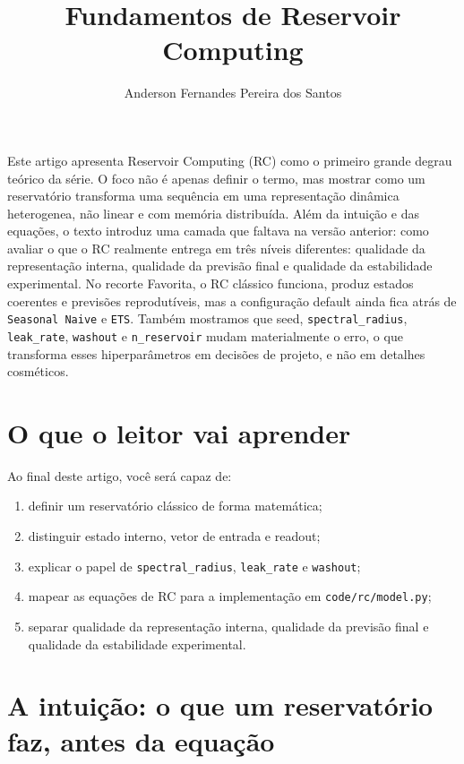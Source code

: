 \documentclass[12pt]{article}
\title{Fundamentos de Reservoir Computing}
\author{Anderson Fernandes Pereira dos Santos}
\providecommand{\tightlist}{%
              \setlength{\itemsep}{0pt}\setlength{\parskip}{0pt}}
\begin{document}
            \maketitle

            \begin{resumo}
            Este artigo apresenta Reservoir Computing (RC) como o primeiro grande degrau teórico da série. O foco não é apenas definir o termo, mas mostrar como um reservatório transforma uma sequência em uma representação dinâmica heterogenea, não linear e com memória distribuída. Além da intuição e das equações, o texto introduz uma camada que faltava na versão anterior: como avaliar o que o RC realmente entrega em três níveis diferentes: qualidade da representação interna, qualidade da previsão final e qualidade da estabilidade experimental. No recorte Favorita, o RC clássico funciona, produz estados coerentes e previsões reprodutíveis, mas a configuração default ainda fica atrás de \texttt{Seasonal\ Naive} e \texttt{ETS}. Também mostramos que seed, \texttt{spectral\_radius}, \texttt{leak\_rate}, \texttt{washout} e \texttt{n\_reservoir} mudam materialmente o erro, o que transforma esses hiperparâmetros em decisões de projeto, e não em detalhes cosméticos.
            \end{resumo}

            \section{O que o leitor vai aprender}\label{1-o-que-o-leitor-vai-aprender}

Ao final deste artigo, você será capaz de:

\begin{enumerate}
\def\labelenumi{\arabic{enumi}.}
\tightlist
\item
  definir um reservatório clássico de forma matemática;
\item
  distinguir estado interno, vetor de entrada e readout;
\item
  explicar o papel de \texttt{spectral\_radius}, \texttt{leak\_rate} e \texttt{washout};
\item
  mapear as equações de RC para a implementação em \texttt{code/rc/model.py};
\item
  separar qualidade da representação interna, qualidade da previsão final e qualidade da estabilidade experimental.
\end{enumerate}

\section{A intuição: o que um reservatório faz, antes da equação}\label{2-a-intuiuxe7uxe3o-o-que-um-reservatuxf3rio-faz-antes-da-equauxe7uxe3o}
\end{document}
